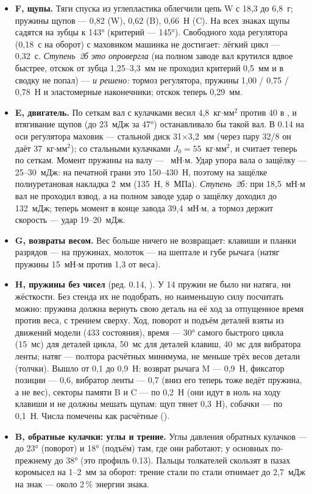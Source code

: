 \begin{itemize}
  \item \textbf{F, щупы.} Тяги спуска из углепластика облегчили цепь W с 18,3 до 6,8~г; пружины щупов — 0,82 (W), 0,62 (B), 0,66~Н (C). На всех знаках щупы садятся на зубцы к 143° (критерий — 145°). Свободного хода регулятора (0,18~с на оборот) с маховиком машинка не достигает: лёгкий цикл — 0,32~с. \emph{Ступень~2б это опровергла} (на полном заводе вал крутился вдвое быстрее, отскок от зубца 1,25--3,3~мм не проходил критерий 0,5~мм и в сводку не попал) — \emph{и решено:} тормоз регулятора, пружины 1,00 / 0,75 / 0,78~Н и эластомерные наконечники; отскок теперь 0,29~мм.
  \item \textbf{E, двигатель.} По сеткам вал с кулачками весил 4,8~кг$\cdot$мм$^2$ против 40 в , и втягивание щупов (до 23~мДж за 47°) останавливало бы такой вал. В 0.14 на оси регулятора маховик — стальной диск 31$\times$3,2~мм (через пару 32/8 он даёт 37~кг$\cdot$мм$^2$); со стальными кулачками $J_0 = 55$~кг$\cdot$мм$^2$, и  считает теперь по сеткам. Момент пружины на валу — \mtauC~мН$\cdot$м. Удар упора вала о защёлку — 25--30~мДж: на печатной грани это 150--430~Н, поэтому на защёлке полиуретановая накладка 2~мм (135~Н, 8~МПа). \emph{Ступень~2б:} при 18,5~мН$\cdot$м вал не проходил взвод, а на полном заводе удар о защёлку доходил до 132~мДж; теперь момент в конце завода 39,4~мН$\cdot$м, а тормоз держит скорость — удар 19--20~мДж.
  \item \textbf{G, возвраты весом.} Вес больше ничего не возвращает: клавиши и планки разрядов — на пружинах, молоток — на шептале и губе рычага (натяг пружины 15~мН$\cdot$м против 1,3 от веса).
  \item \textbf{H, пружины без чисел} (ред. 0.14, ). У 14 пружин не было ни натяга, ни жёсткости. Без стенда их не подобрать, но наименьшую силу посчитать можно: пружина должна вернуть свою деталь на её ход за отпущенное время против веса, с трением сверху. Ход, поворот и подъём деталей взяты из движений модели (433 состояния), время — 30° самого быстрого цикла (15~мс) для деталей цикла, 50~мс для деталей клавиш, 40~мс для вибратора ленты; натяг — полтора расчётных минимума, не меньше трёх весов детали (толчки). Вышло от 0,1 до 0,9~Н: возврат рычага M — 0,9~Н, фиксатор позиции — 0,6, вибратор ленты — 0,7 (вниз его теперь тоже ведёт пружина, а не вес), секторы памяти B и C — по 0,2~Н (они идут в ноль на ходу клавиши и не должны мешать щупам: щуп тянет 0,3~Н), собачки — по 0,1~Н. Числа помечены как расчётные ().
  \item \textbf{B, обратные кулачки: углы и трение.} Углы давления обратных кулачков — до 23° (поворот) и 18° (подъём) там, где они работают; у основных по-прежнему до 38° (это профиль 0.13). Пальцы толкателей скользят в пазах коромысел на 1--2~мм за оборот: трение стали по стали отнимает до 2,7~мДж на знак — около 2\,\% энергии знака.
\end{itemize}

